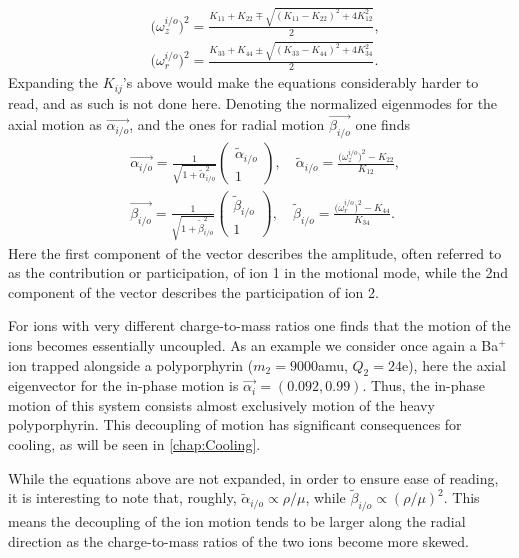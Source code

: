 \begin{align}
    &\big(\omega_z^{i/o}\big)^2 = \frac{K_{11}+K_{22}\mp\sqrt{(K_{11}-K_{22})^2+4K_{12}^2}}{2},\\
    &\big(\omega_r^{i/o}\big)^2 = \frac{K_{33}+K_{44}\pm\sqrt{(K_{33}-K_{44})^2+4K_{34}^2}}{2}.
\end{align}
Expanding the $K_{ij}$'s above would make the equations considerably harder to read, and as such is not done here. Denoting the normalized eigenmodes for the axial motion as $\vec{\alpha_{i/o}}$, and the ones for radial motion $\vec{\beta_{i/o}}$ one finds
\begin{align}
    &\vec{\alpha_{i/o}} = \frac{1}{\sqrt{1+\tilde{\alpha}_{i/o}^2}}
    \begin{pmatrix}
        \tilde{\alpha}_{i/o} \\
        1
    \end{pmatrix},\quad \tilde{\alpha}_{i/o} = \frac{\big(\omega_z^{i/o}\big)^2-K_{22}}{K_{12}},\\
    &\vec{\beta_{i/o}} = \frac{1}{\sqrt{1+\tilde{\beta}_{i/o}^2}}
    \begin{pmatrix}
        \tilde{\beta}_{i/o} \\
        1
    \end{pmatrix},\quad \tilde{\beta}_{i/o} = \frac{\big(\omega_r^{i/o}\big)^2-K_{44}}{K_{34}}.
\end{align}
Here the first component of the vector describes the amplitude, often referred to as the contribution or participation, of ion 1 in the motional mode, while the 2nd component of the vector describes the participation of ion 2.


For ions with very different charge-to-mass ratios one finds that the motion of the ions becomes essentially uncoupled. As an example we consider once again a Ba$^+$ ion trapped alongside a polyporphyrin ($m_2 = 9000$amu, $Q_2 = 24$e), here the axial eigenvector for the in-phase motion is $\vec{\alpha_{i}} = (0.092,0.99)$. Thus, the in-phase motion of this system consists almost exclusively motion of the heavy polyporphyrin. This decoupling of motion has significant consequences for cooling, as will be seen in \cref{chap:Cooling}.


While the equations above are not expanded, in order to ensure ease of reading, it is interesting to note that, roughly, $\tilde{\alpha}_{i/o}\propto\rho/\mu$, while $\tilde{\beta}_{i/o}\propto(\rho/\mu)^2$. This means the decoupling of the ion motion tends to be larger along the radial direction as the charge-to-mass ratios of the two ions become more skewed.
